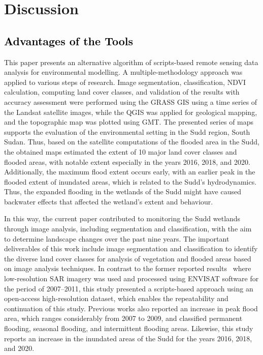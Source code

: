 \documentclass[analytics,article,accept,pdftex,moreauthors]{Definitions/mdpi}
\begin{document}
\section{Discussion}

\subsection{\textcolor{black}{Advantages of the Tools}}

{This paper presents an alternative algorithm} of scripts-based remote sensing data analysis for environmental modelling. A multiple-methodology approach was applied to various steps of research. Image segmentation, classification, NDVI calculation, computing land cover classes, and validation of the results with accuracy assessment were performed using the GRASS GIS using a time series of the Landsat satellite images, while the QGIS was applied for geological mapping, and the topographic map was plotted using GMT. The presented series of maps supports the evaluation of the environmental setting in the Sudd region, South Sudan. Thus, based on the satellite computations of the flooded area in the Sudd, the obtained maps estimated the extent of 10 major land cover classes and flooded areas, with notable extent especially in the years 2016, 2018, and 2020. Additionally, the maximum flood extent occurs early, with  an earlier peak in the flooded extent  of inundated areas, which is related to the Sudd's hydrodynamics. Thus, the expanded flooding in the wetlands of the Sudd might have caused backwater effects that affected the wetland's extent and behaviour. %

{In this way, }the current paper contributed to monitoring the Sudd wetlands through image analysis, including segmentation and classification, with the aim to determine landscape changes over the past nine years. The important deliverables of this work include image segmentation and classification to identify the diverse land cover classes for analysis of vegetation and flooded areas based on image analysis techniques. In contrast to the former reported results~\cite{WILUSZ2017205} where low-resolution SAR imagery was used and processed using ENVISAT software for the period of 2007--2011, this study presented a scripts-based approach using an open-access high-resolution dataset, which enables the repeatability and continuation of this study. Previous works also reported an increase in peak flood area, which ranges considerably from 2007 to 2009, and classified permanent flooding, seasonal flooding, and intermittent flooding areas. Likewise, this study reports an increase in the inundated areas of the Sudd for the years 2016, 2018, and 2020. 
\end{document}
